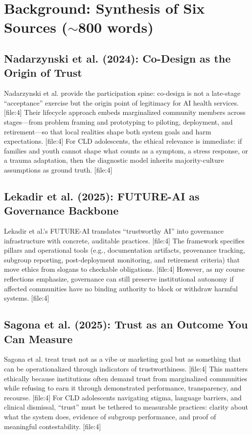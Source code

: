 \documentclass[12pt]{article}
\begin{document}
\section{Background: Synthesis of Six Sources (\texorpdfstring{$\sim$}{\textasciitilde}800 words)}

\subsection*{Nadarzynski et al. (2024): Co-Design as the Origin of Trust}
Nadarzynski et al. provide the participation spine: co-design is not a late-stage ``acceptance'' exercise but the origin point of legitimacy for AI health services. [file:4]
Their lifecycle approach embeds marginalized community members across stages---from problem framing and prototyping to piloting, deployment, and retirement---so that local realities shape both system goals and harm expectations. [file:4]
For CLD adolescents, the ethical relevance is immediate: if families and youth cannot shape what counts as a symptom, a stress response, or a trauma adaptation, then the diagnostic model inherits majority-culture assumptions as ground truth. [file:4]

\subsection*{Lekadir et al. (2025): FUTURE-AI as Governance Backbone}
Lekadir et al.'s FUTURE-AI translates ``trustworthy AI'' into governance infrastructure with concrete, auditable practices. [file:4]
The framework specifies pillars and operational tools (e.g., documentation artifacts, provenance tracking, subgroup reporting, post-deployment monitoring, and retirement criteria) that move ethics from slogans to checkable obligations. [file:4]
However, as my course reflections emphasize, governance can still preserve institutional autonomy if affected communities have no binding authority to block or withdraw harmful systems. [file:4]

\subsection*{Sagona et al. (2025): Trust as an Outcome You Can Measure}
Sagona et al. treat trust not as a vibe or marketing goal but as something that can be operationalized through indicators of trustworthiness. [file:4]
This matters ethically because institutions often demand trust from marginalized communities while refusing to earn it through demonstrated performance, transparency, and recourse. [file:4]
For CLD adolescents navigating stigma, language barriers, and clinical dismissal, ``trust'' must be tethered to measurable practices: clarity about what the system does, evidence of subgroup performance, and proof of meaningful contestability. [file:4]
\end{document}
